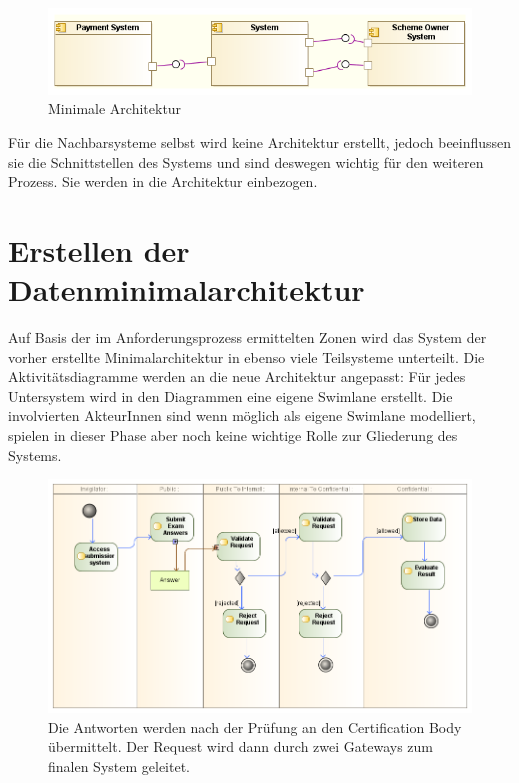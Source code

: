 \begin{figure}[H]
    \centering
    \includegraphics[scale=0.7]{uml/minimalarch.png}
    \caption{Minimale Architektur}
\end{figure}

Für die Nachbarsysteme selbst wird keine Architektur erstellt, jedoch beeinflussen sie die Schnittstellen des Systems und sind deswegen wichtig für den weiteren Prozess. Sie werden in die Architektur einbezogen.

\section{Erstellen der Datenminimalarchitektur}
Auf Basis der im Anforderungsprozess ermittelten Zonen wird das System der vorher erstellte Minimalarchitektur in ebenso viele Teilsysteme unterteilt. Die Aktivitätsdiagramme werden an die neue Architektur angepasst: Für jedes Untersystem wird in den Diagrammen eine eigene Swimlane erstellt. Die involvierten AkteurInnen sind wenn möglich als eigene Swimlane modelliert, spielen in dieser Phase aber noch keine wichtige Rolle zur Gliederung des Systems.

\begin{figure}[H]
    \centering
    \includegraphics[scale=0.5]{uml/takeexamactivity1.png}
    \caption{Die Antworten werden nach der Prüfung an den Certification Body übermittelt. Der Request wird dann durch zwei Gateways zum finalen System geleitet.}
\end{figure}

